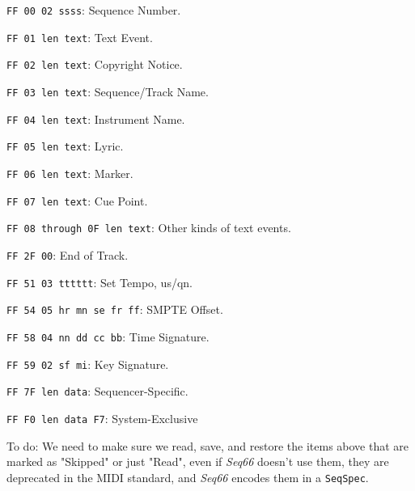    \begin{enumber}
      \item \texttt{FF 00 02 ssss}: Sequence Number.
      \item \texttt{FF 01 len text}: Text Event.
      \item \texttt{FF 02 len text}: Copyright Notice.
      \item \texttt{FF 03 len text}: Sequence/Track Name.
      \item \texttt{FF 04 len text}: Instrument Name.
      \item \texttt{FF 05 len text}: Lyric.
      \item \texttt{FF 06 len text}: Marker.
      \item \texttt{FF 07 len text}: Cue Point.
      \item \texttt{FF 08 through 0F len text}: Other kinds of  text events.
      \item \texttt{FF 2F 00}: End of Track.
      \item \texttt{FF 51 03 tttttt}: Set Tempo, us/qn.
      \item \texttt{FF 54 05 hr mn se fr ff}: SMPTE Offset.
      \item \texttt{FF 58 04 nn dd cc bb}: Time Signature.
      \item \texttt{FF 59 02 sf mi}: Key Signature.
      \item \texttt{FF 7F len data}: Sequencer-Specific.
      \item \texttt{FF F0 len data F7}: System-Exclusive
   \end{enumber}

   To do:
   We need to make sure we read, save, and restore the items above that are
   marked as "Skipped" or just "Read",
   even if \textsl{Seq66} doesn't use them, they are deprecated in the MIDI
   standard, and \textsl{Seq66} encodes them in a \texttt{SeqSpec}.


